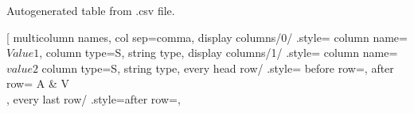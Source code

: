\documentclass{article}
\begin{document}
	\begin{table}[h!]
		\begin{center}
			\caption{Autogenerated table from .csv file.}
			\label{table1}
			\pgfplotstabletypeset[
			multicolumn names, %
			col sep=comma, %
			display columns/0/ .style={
			column name=$Value 1$, %
			column type={S}, string type}, %
			display columns/1/ .style={
			column name=$value 2$
		    column type={S}, string type},
			every head row/ .style={
			before row={\toprule}, %
		    after row={
	   \si{\ampere} & \si{\volt}\\ %
	    \midrule} %
    },
every last row/ .style={after row=\bottomrule}, %
		\end{center}
	\end{table}
\end{document}
